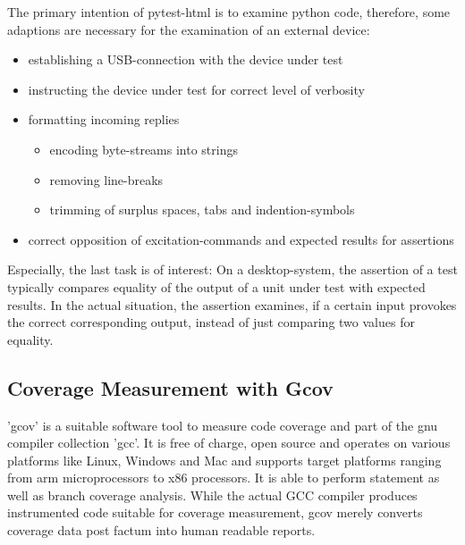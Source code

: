 \documentclass[master,english,smartquotes,apa]{hgbthesis}
\begin{document}
				 The primary intention of pytest-html is to examine python code, therefore, some adaptions are necessary for the examination of an external device: \\
				\begin{itemize} \setlength\itemsep{1px}
				\item establishing a USB-connection with the device under test
				\item instructing the device under test for correct level of verbosity
				\item formatting incoming replies 
					\begin{itemize} \setlength\itemsep{1px}
						\item encoding byte-streams into strings
						\item removing line-breaks
						\item trimming of surplus spaces, tabs and indention-symbols
					\end{itemize}
				\item correct opposition of excitation-commands and expected results for assertions \\
				\end{itemize}
			Especially, the last task is of interest: On a desktop-system, the assertion of a test typically compares equality of the output of a unit under test with expected results. In the actual situation, the assertion examines, if a certain input provokes the correct corresponding output, instead of just comparing two values for equality. 
			
			\subsection{Coverage Measurement with Gcov}
				'gcov' is a suitable software tool to measure code coverage and part of the gnu compiler collection 'gcc'. It is free of charge, open source and operates on various platforms like Linux, Windows and Mac and supports target platforms ranging from arm microprocessors to x86 processors. It is able to perform statement as well as branch coverage analysis. While the actual GCC compiler produces instrumented code suitable for coverage measurement, gcov merely converts coverage data post factum into human readable reports.
\end{document}
